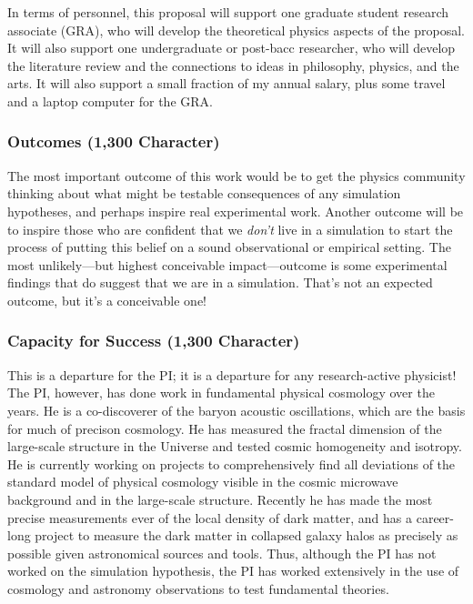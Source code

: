 \documentclass[12pt]{article}
\begin{document}
In terms of personnel, this proposal will support one graduate student research associate (GRA), who will develop the theoretical physics aspects of the proposal.
It will also support one undergraduate or post-bacc researcher, who will develop the literature review and the connections to ideas in philosophy, physics, and the arts.
It will also support a small fraction of my annual salary, plus some travel and a laptop computer for the GRA.

\subsubsection*{Outcomes (1,300 Character)}
The most important outcome of this work would be to get the physics community thinking about what might be testable consequences of any simulation hypotheses, and perhaps inspire real experimental work.
Another outcome will be to inspire those who are confident that we \emph{don't} live in a simulation to start the process of putting this belief on a sound observational or empirical setting.
The most unlikely---but highest conceivable impact---outcome is some experimental findings that do suggest that we are in a simulation.
That's not an expected outcome, but it's a conceivable one!

\subsubsection*{Capacity for Success (1,300 Character)}
This is a departure for the PI; it is a departure for any research-active physicist!
The PI, however, has done work in fundamental physical cosmology over the years.
He is a co-discoverer of the baryon acoustic oscillations, which are the basis for much of precison cosmology.
He has measured the fractal dimension of the large-scale structure in the Universe and tested cosmic homogeneity and isotropy.
He is currently working on projects to comprehensively find all deviations of the standard model of physical cosmology visible in the cosmic microwave background and in the large-scale structure.
Recently he has made the most precise measurements ever of the local density of dark matter, and has a career-long project to measure the dark matter in collapsed galaxy halos as precisely as possible given astronomical sources and tools.
Thus, although the PI has not worked on the simulation hypothesis, the PI has worked extensively in the use of cosmology and astronomy observations to test fundamental theories.
\end{document}
